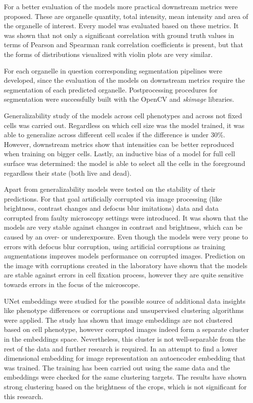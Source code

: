 
For a better evaluation of the models more practical downstream metrics were proposed. These are organelle quantity, total intensity, mean intensity and area of the organelle of interest. Every model was evaluated based on these metrics. It was shown that not only a significant correlation with ground truth values in terms of Pearson and Spearman rank correlation coefficients is present, but that the forms of distributions visualized with violin plots are very similar. 

For each organelle in question corresponding segmentation pipelines were developed, since the evaluation of the models on downstream metrics require the segmentation of each predicted organelle. Postprocessing procedures for segmentation were successfully built with the OpenCV and \textit{skimage} libraries. 

Generalizability study of the models across cell phenotypes and across not fixed cells was carried out. Regardless on which cell size was the model trained, it was able to generalize across different cell scales if the difference is under $30\%$. However, downstream metrics show that intensities can be better reproduced when training on bigger cells. Lastly, an inductive bias of a model for full cell surface was determined: the model is able to select all the cells in the foreground regardless their state (both live and dead). 

Apart from generalizability models were tested on the stability of their predictions. For that goal artificially corrupted via image processing (like brightness, contrast changes and defocus blur imitations) data and data corrupted from faulty microscopy settings were introduced. It was shown that the models are very stable against changes in contrast and brightness, which can be caused by an over- or underexposure. Even though the models were very prone to errors with defocus blur corruption, using artificial corruptions as training augmentations improves models performance on corrupted images. Prediction on the image with corruptions created in the laboratory have shown that the models are stable against errors in cell fixation process, however they are quite sensitive towards errors in the focus of the microscope.

UNet embeddings were studied for the possible source of additional data insights like phenotype differences or corruptions and unsupervised clustering algorithms were applied. The study has shown that image embeddings are not clustered based on cell phenotype, however corrupted images indeed form a separate cluster in the embeddings space. Nevertheless, this cluster is not well-separable from the rest of the data and further research is required. In an attempt to find a lower dimensional embedding for image representation an autoencoder embedding that was trained. The training has been carried out using the same data and the embeddings were checked for the same clustering targets. The results have shown strong clustering based on the brightness of the crops, which is not significant for this research.

